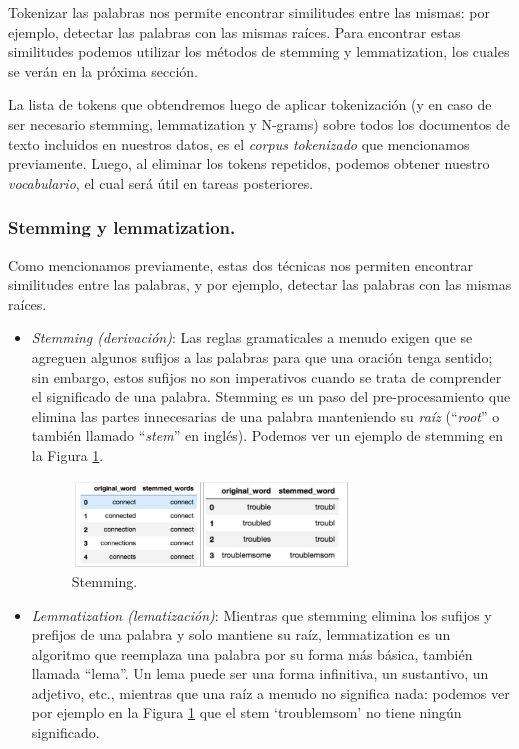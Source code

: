\documentclass[12pt,a4paper]{article}
\begin{document}
\begin{sloppypar}
Tokenizar las palabras nos permite encontrar similitudes entre las mismas: por ejemplo, detectar las palabras con las mismas raíces. Para encontrar estas similitudes podemos utilizar los métodos de stemming y lemmatization, los cuales se verán en la próxima sección.

La lista de tokens que obtendremos luego de aplicar tokenización (y en caso de ser necesario stemming, lemmatization y N-grams) sobre todos los documentos de texto incluidos en nuestros datos, es el \textit{corpus tokenizado} que mencionamos previamente. Luego, al eliminar los tokens repetidos, podemos obtener nuestro \textit{vocabulario}, el cual será útil en tareas posteriores.

\cleardoublepage

\subsubsection{Stemming y lemmatization.}\label{stem_y_lem}

Como mencionamos previamente, estas dos técnicas nos permiten encontrar similitudes entre las palabras, y por ejemplo, detectar las palabras con las mismas raíces.

\begin{itemize}

\item \textit{Stemming (derivación)}: Las reglas gramaticales a menudo exigen que se agreguen algunos sufijos a las palabras para que una oración tenga sentido; sin embargo, estos sufijos no son imperativos cuando se trata de comprender el significado de una palabra. Stemming es un paso del pre-procesamiento que elimina las partes innecesarias de una palabra manteniendo su \textit{raíz} (“\textit{root}” o también llamado “\textit{stem}” en inglés). Podemos ver un ejemplo de stemming en la Figura \ref{fig:Imagen_NLP_4}.

\begin{figure}[H]    
 \centering
 \includegraphics[width=0.7\textwidth]{images/NLP/4.png}
 \caption{Stemming\cite{NLP_2}.}
 \label{fig:Imagen_NLP_4}
\end{figure}

\item \textit{Lemmatization (lematización)}: Mientras que stemming elimina los sufijos y prefijos de una palabra y solo mantiene su raíz, lemmatization es un algoritmo que reemplaza una palabra por su forma más básica, también llamada “lema”. Un lema puede ser una forma infinitiva, un sustantivo, un adjetivo, etc., mientras que una raíz a menudo no significa nada: podemos ver por ejemplo en la Figura \ref{fig:Imagen_NLP_4} que el stem ‘troublemsom’ no tiene ningún significado. 


\end{itemize}
\end{sloppypar}
\end{document}
